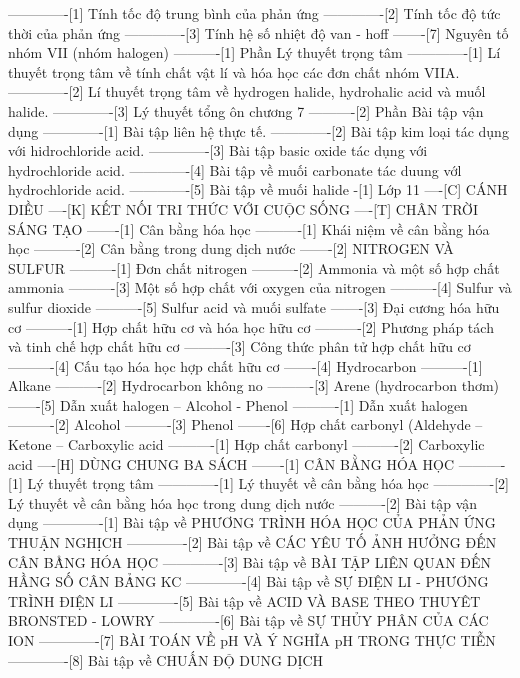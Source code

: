 -------------[1] Tính tốc độ trung bình của phản ứng
-------------[2] Tính tốc độ tức thời của phản ứng
-------------[3] Tính hệ số nhiệt độ van - hoff
-------[7] Nguyên tố nhóm VII (nhóm halogen)
----------[1] Phần Lý thuyết trọng tâm
-------------[1] Lí thuyết trọng tâm về tính chất vật lí và hóa học các đơn chất nhóm VIIA.
-------------[2] Lí thuyết trọng tâm về hydrogen halide, hydrohalic acid và muốl halide. 
-------------[3] Lý thuyết tổng ôn chương 7
----------[2] Phần Bài tập vận dụng
-------------[1] Bài tập liên hệ thực tế.
-------------[2] Bài tập kim loại tác dụng với hidrochloride acid.
-------------[3] Bài tập basic oxide tác dụng với hydrochloride acid.
-------------[4] Bài tập về muối carbonate tác duung vớl hydrochloride acid.
-------------[5] Bài tập về muối halide
-[1] Lớp 11
----[C] CÁNH DIỀU
----[K] KẾT NỐI TRI THỨC VỚI CUỘC SỐNG
----[T] CHÂN TRỜI SÁNG TẠO
-------[1] Cân bằng hóa học
----------[1] Khái niệm về cân bằng hóa học
----------[2] Cân bằng trong dung dịch nước
-------[2] NITROGEN VÀ SULFUR
----------[1] Đơn chất nitrogen
----------[2] Ammonia và một số hợp chất ammonia
----------[3] Một số hợp chất với oxygen của nitrogen
----------[4] Sulfur và sulfur dioxide
----------[5] Sulfur acid và muối sulfate
-------[3] Đại cương hóa hữu cơ
----------[1] Hợp chất hữu cơ và hóa học hữu cơ
----------[2] Phương pháp tách và tinh chế hợp chất hữu cơ
----------[3] Công thức phân tử hợp chất hữu cơ
----------[4] Cấu tạo hóa học hợp chất hữu cơ
-------[4] Hydrocarbon
----------[1] Alkane
----------[2] Hydrocarbon không no
----------[3] Arene (hydrocarbon thơm)
-------[5] Dẫn xuất halogen – Alcohol - Phenol
----------[1] Dẫn xuất halogen
----------[2] Alcohol 
----------[3] Phenol
-------[6] Hợp chất carbonyl (Aldehyde – Ketone – Carboxylic acid
----------[1] Hợp chất carbonyl
----------[2] Carboxylic acid
----[H] DÙNG CHUNG BA SÁCH
-------[1] CÂN BẰNG HÓA HỌC
----------[1] Lý thuyết trọng tâm
-------------[1] Lý thuyết về cân bằng hóa học
-------------[2] Lý thuyết về cân bằng hóa học trong dung dịch nước
----------[2] Bài tập vận dụng
-------------[1] Bài tập về PHƯƠNG TRÌNH HÓA HỌC CỦA PHẢN ỨNG THUẬN NGHỊCH
-------------[2] Bài tập về CÁC YÊU TỐ ẢNH HƯỞNG ĐẾN CÂN BÅ̀NG HÓA HỌC
-------------[3] Bài tập về BÀI TẬP LIÊN QUAN ĐẾN HẦNG SỐ CÂN BẢ̀NG KC
-------------[4] Bài tập về SỰ ĐIỆN LI - PHƯƠNG TRÌNH ĐIỆN LI
-------------[5] Bài tập về ACID VÀ BASE THEO THUYÊT BRONSTED - LOWRY
-------------[6] Bài tập về SỰ THỦY PHÂN CỦA CÁC ION
-------------[7] BÀI TOÁN VỀ pH VÀ Ý NGHĨA pH TRONG THỰC TIỄN
-------------[8] Bài tập về CHUẤN ĐỘ DUNG DỊCH

